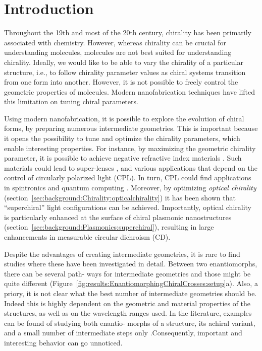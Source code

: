 \section{Introduction}\label{sec:results:EnantiomorphingChiralCrosses:introduction}
Throughout the 19th and most of the 20th century, chirality has been primarily associated with chemistry. However, whereas chirality can be crucial for understanding molecules, molecules are not best suited for understanding chirality.  
Ideally, we would like to be able to vary the chirality of a particular structure, i.e., to follow chirality parameter values as chiral systems transition from one form into another. However, it is not possible to freely control the geometric properties of molecules. Modern nanofabrication techniques have lifted this limitation on tuning chiral parameters.

Using modern nanofabrication, it is possible to explore the evolution of chiral forms, by preparing numerous intermediate geometries. This is important because it opens the possibility to tune and optimize the chirality parameters, which enable interesting properties. For instance, by maximizing the geometric chirality parameter, it is possible to achieve negative refractive index materials \cite{Pendry2004a}. Such materials could lead to super-lenses \cite{Khorasaninejad2016}, and various applications that depend on the control of circularly polarized light (CPL). In turn, CPL could find applications in spintronics \cite{Farshchi2011b} and quantum computing \cite{Wagenknecht2010a, Sherson2006a}.
Moreover, by optimizing \textit{optical chirality} (section~\ref{sec:background:Chirality:opticalchirality}) it has been shown that ``superchiral'' light configurations can be achieved. Importantly, optical chirality is particularly enhanced at the surface of chiral plasmonic nanostructures (section~\ref{sec:background:Plasmonics:superchiral}), resulting in large enhancements in measurable circular dichroism (CD).

Despite the advantages of creating intermediate geometries, it is rare to find studies where these have been investigated in detail. Between two enantiomorphs, there can be several path- ways for intermediate geometries and those might be quite different (Figure~\ref{fig:results:EnantiomorphingChiralCrosses:setup}a). 
Also, a priory, it is not clear what the best number of intermediate geometries should be. Indeed this is highly dependent on the geometric and material properties of the structures, as well as on the wavelength ranges used. In the literature, examples can be found of studying both enantio- morphs of a structure, its achiral variant, and a small number of intermediate steps only \cite{Zu2016}.Consequently, important and interesting behavior can go unnoticed.

